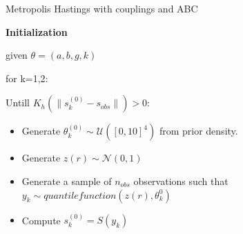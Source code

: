 \documentclass{beamer}
\begin{document}
\begin{frame}{Metropolis Hastings with couplings and ABC}


	\begin{block}{}
		\begin{center}
			\textbf{Initialization} 
		\end{center}
	\end{block}	
	given $\theta =( a,b,g,k )$
	
	for k=1,2:
	
	 Untill $K_h(\|s_{k}^{(0)} - s_{obs}\|)>0$:
		\begin{itemize}
			\item Generate $\theta_{k}^{(0)} \sim \mathcal{U}([0,10]^4)$ from prior density.
			\item Generate $z(r) \sim \mathcal{N}(0,1)$
			\item Generate a sample of $n_{obs}$ observations such that $y_{k} \sim quantile function(z(r),\theta_{k}^{0})$
			\item Compute $s_{k}^{(0)}=S(y_{k})$
			
		\end{itemize}

	

		
		\end{frame}
\end{document}
